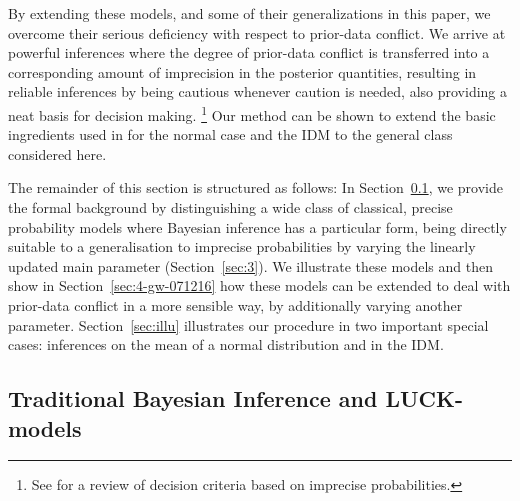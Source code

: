 By extending these models, and some of their generalizations in this
paper, we overcome their serious deficiency with respect to
prior-data conflict. We arrive at powerful inferences where the
degree of prior-data conflict is transferred into a corresponding
amount of imprecision in the posterior quantities, resulting in
reliable inferences by being cautious whenever caution is needed,
also providing a neat basis for decision making.%
\footnote{See \textcite{2007:troffaes} for a review of decision criteria based
on imprecise probabilities.}
Our method can be shown to extend the
basic ingredients used in \textcite{1991:walley} for the normal case and the
IDM to the general class considered here.

\medskip

The remainder of this section is structured as follows:
In Section~\ref{070517-sec2-1}, we provide the formal background
by distinguishing a wide class of classical, precise probability models
where Bayesian inference has a particular form, being directly
suitable to a generalisation to imprecise probabilities by varying
the linearly updated main parameter (Section~\ref{sec:3}).
We illustrate these models and then show in Section~\ref{sec:4-gw-071216}
how these models can be extended to deal with prior-data conflict in a more sensible way,
by additionally varying another parameter.
Section~\ref{sec:illu} illustrates our procedure in two important special cases:
inferences on the mean of a normal distribution and in the IDM.


\subsection{Traditional Bayesian Inference and LUCK-models}
\label{070517-sec2-1}

